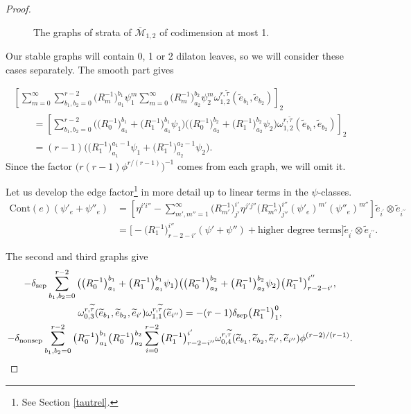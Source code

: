 \documentclass[pdftex]{sigma}
\def\oM{\overline{\mathcal{M}}}
\numberwithin{equation}{section}
\begin{document}
\begin{proof}
\begin{figure}[t]
\caption{The graphs of strata of \texorpdfstring{$\oM_{1,2}$}{M 1,2} of codimension at most 1.}	\label{fig:chefigura}
\end{figure}


Our stable graphs will contain 0, 1 or 2 dilaton leaves, so we will consider these cases separately. The smooth part gives

\begin{gather*}
 \left[\sum_{m=0}^{\infty}\sum^{r-2}_{b_1,b_2=0} \big(R_m^{-1}\big)^{b_1}_{a_1}\psi_1^m \sum_{m=0}^{\infty} \big(R_m^{-1}\big)^{b_2}_{a_2}\psi_2^m \omega ^{r,\widetilde{\tau}}_{1,2}(\widetilde{e}_{b_1},\widetilde{e}_{b_2})\right]_2\\
\qquad=\left[\sum_{b_1,b_2=0}^{r-2}\big(\big(R_0^{-1}\big)^{b_1}_{a_1}+\big(R_1^{-1}\big)^{b_1}_{a_1}\psi_1\big)
\big(\big(R_0^{-1}\big)^{b_2}_{a_2}+\big(R_1^{-1}\big)^{b_2}_{a_2}\psi_2\big) \omega ^{r,\widetilde{\tau}}_{1,2}(\widetilde{e}_{b_1},\widetilde{e}_{b_2})\right]_2\\
\qquad=(r-1)\big(\big(R_1^{-1}\big)^{a_1-1}_{a_1}\psi_1+\big(R_1^{-1}\big)^{a_2-1}_{a_2}\psi_2\big).
\end{gather*}
Since the factor $\bigl(r(r-1)\phi^{r/(r-1)}\bigr)^{-1}$ comes from each graph, we will omit it.

Let us develop the edge factor\footnote{See Section \ref{tautrel}.} in more detail up to linear terms in the $\psi$-classes.
\begin{align*}
\mathrm{Cont}(e)(\psi'_e+\psi''_e) &= \left[\eta^{i'i''}-\sum_{m',m''=1}^\infty \big(R^{-1}_{m'}\big)_{j'}^{i'} \eta^{j'j''} \big(R^{-1}_{m''}\big)_{j''}^{i''} (\psi'_e)^{m'}(\psi''_e)^{m''}\right]\widetilde{e}_{i^\prime}\otimes\widetilde{e}_{i^{\prime\prime}}\\
&=\bigl[-\big(R_1^{-1}\big)^{i''}_{r-2-i'}(\psi'+\psi'') + \text{higher degree terms}\bigr]\widetilde{e}_{i^\prime}\otimes\widetilde{e}_{i^{\prime\prime}} .
\end{align*}

The second and third graphs give
\begin{gather*}
 -\delta_{\rm sep}\sum_{b_1,b_2=0}^{r-2}\big(\big(R_0^{-1}\big)^{b_1}_{a_1}+\big(R_1^{-1}\big)^{b_1}_{a_1}\psi_1\big)
\big(\big(R_0^{-1}\big)^{b_2}_{a_2}+\big(R_1^{-1}\big)^{b_2}_{a_2}\psi_2\big)\big(R_1^{-1}\big)^{i''}_{r-2-i'},\\
\omega ^{r,\widetilde{\tau}}_{0,3}(\widetilde{e}_{b_1},\widetilde{e}_{b_2},\widetilde{e}_{i'})\omega ^{r,\widetilde{\tau}}_{1,1}
(\widetilde{e}_{i''})
=-(r-1)\delta_{\rm sep}\big(R_1^{-1}\big)^{0}_{1},\\
 -\delta_{\rm nonsep} \sum_{b_1,b_2=0}^{r-2} \big(R_0^{-1}\big)^{b_1}_{a_1}\big(R_0^{-1}\big)^{b_2}_{a_2}
 \sum_{i=0}^{r-2}\big(R_1^{-1}\big)^{i'}_{r-2-i''}
\omega ^{r,\widetilde{\tau}}_{0,4}(\widetilde{e}_{b_1},\widetilde{e}_{b_2},\widetilde{e}_{i'},\widetilde{e}_{i''}) \phi^{(r-2)/(r-1)}.
\end{gather*}


\end{proof}
\end{document}
